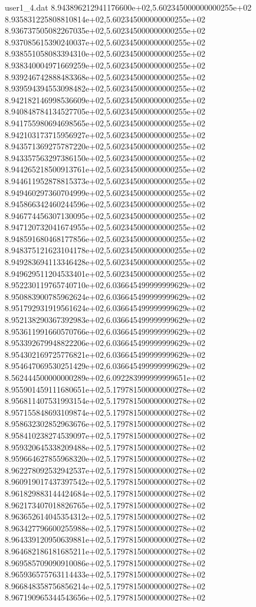 \begin{filecontents}{user1_4.dat}
8.943896212941176600e+02,5.602345000000000255e+02
8.935831225808810814e+02,5.602345000000000255e+02
8.936737505082267035e+02,5.602345000000000255e+02
8.937085615390240037e+02,5.602345000000000255e+02
8.938551058083394310e+02,5.602345000000000255e+02
8.938340004971669259e+02,5.602345000000000255e+02
8.939246742888483368e+02,5.602345000000000255e+02
8.939594394553098482e+02,5.602345000000000255e+02
8.942182146998536609e+02,5.602345000000000255e+02
8.940848784134527705e+02,5.602345000000000255e+02
8.941755980694698565e+02,5.602345000000000255e+02
8.942103173715956927e+02,5.602345000000000255e+02
8.943571369275787220e+02,5.602345000000000255e+02
8.943357563297386150e+02,5.602345000000000255e+02
8.944265218500913761e+02,5.602345000000000255e+02
8.944611952878815373e+02,5.602345000000000255e+02
8.949460297360704999e+02,5.602345000000000255e+02
8.945866342460244596e+02,5.602345000000000255e+02
8.946774456307130095e+02,5.602345000000000255e+02
8.947120732041674955e+02,5.602345000000000255e+02
8.948591680468177856e+02,5.602345000000000255e+02
8.948375121623104178e+02,5.602345000000000255e+02
8.949283694113346428e+02,5.602345000000000255e+02
8.949629511204533401e+02,5.602345000000000255e+02
8.952230119765740710e+02,6.036645499999999629e+02
8.950883900785962624e+02,6.036645499999999629e+02
8.951792931919561624e+02,6.036645499999999629e+02
8.952138290367392983e+02,6.036645499999999629e+02
8.953611991660570766e+02,6.036645499999999629e+02
8.953392679948822206e+02,6.036645499999999629e+02
8.954302169725776821e+02,6.036645499999999629e+02
8.954647069530251429e+02,6.036645499999999629e+02
8.562444500000000289e+02,6.092283999999999651e+02
8.955901459111680651e+02,5.179781500000000278e+02
8.956811407531993154e+02,5.179781500000000278e+02
8.957155848693109874e+02,5.179781500000000278e+02
8.958632302852963676e+02,5.179781500000000278e+02
8.958410238274539097e+02,5.179781500000000278e+02
8.959320645338209488e+02,5.179781500000000278e+02
8.959664627855968320e+02,5.179781500000000278e+02
8.962278092532942537e+02,5.179781500000000278e+02
8.960919017437397542e+02,5.179781500000000278e+02
8.961829883144424684e+02,5.179781500000000278e+02
8.962173407018826765e+02,5.179781500000000278e+02
8.963652614045354312e+02,5.179781500000000278e+02
8.963427796600255988e+02,5.179781500000000278e+02
8.964339120950639881e+02,5.179781500000000278e+02
8.964682186181685211e+02,5.179781500000000278e+02
8.969585709090910086e+02,5.179781500000000278e+02
8.965936575763114433e+02,5.179781500000000278e+02
8.966848358756856214e+02,5.179781500000000278e+02
8.967190965344543656e+02,5.179781500000000278e+02

\end{filecontents}
